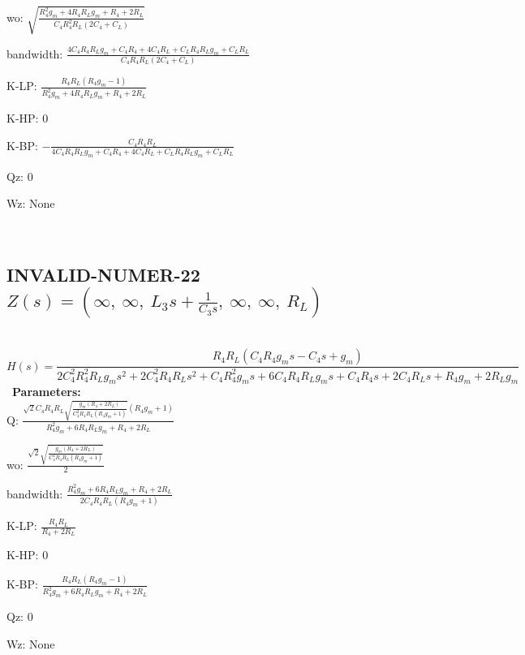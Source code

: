 \documentclass{article}
\begin{document}
wo: $\sqrt{\frac{R_{4}^{2} g_{m} + 4 R_{4} R_{L} g_{m} + R_{4} + 2 R_{L}}{C_{4} R_{4}^{2} R_{L} \left(2 C_{4} + C_{L}\right)}}$\ 

bandwidth: $\frac{4 C_{4} R_{4} R_{L} g_{m} + C_{4} R_{4} + 4 C_{4} R_{L} + C_{L} R_{4} R_{L} g_{m} + C_{L} R_{L}}{C_{4} R_{4} R_{L} \left(2 C_{4} + C_{L}\right)}$\ 

K-LP: $\frac{R_{4} R_{L} \left(R_{4} g_{m} - 1\right)}{R_{4}^{2} g_{m} + 4 R_{4} R_{L} g_{m} + R_{4} + 2 R_{L}}$\ 

K-HP: $0$\ 

K-BP: $- \frac{C_{4} R_{4} R_{L}}{4 C_{4} R_{4} R_{L} g_{m} + C_{4} R_{4} + 4 C_{4} R_{L} + C_{L} R_{4} R_{L} g_{m} + C_{L} R_{L}}$\ 

Qz: $0$\ 

Wz: $\text{None}$\ 

\ 

\subsection{INVALID-NUMER-22 $Z(s) = \left( \infty, \  \infty, \  L_{3} s + \frac{1}{C_{3} s}, \  \infty, \  \infty, \  R_{L}\right)$ } \ 
\textbf{\[H(s) = \frac{R_{4} R_{L} \left(C_{4} R_{4} g_{m} s - C_{4} s + g_{m}\right)}{2 C_{4}^{2} R_{4}^{2} R_{L} g_{m} s^{2} + 2 C_{4}^{2} R_{4} R_{L} s^{2} + C_{4} R_{4}^{2} g_{m} s + 6 C_{4} R_{4} R_{L} g_{m} s + C_{4} R_{4} s + 2 C_{4} R_{L} s + R_{4} g_{m} + 2 R_{L} g_{m}}\] } \ 
\textbf{Parameters:}\\ 

Q: $\frac{\sqrt{2} C_{4} R_{4} R_{L} \sqrt{\frac{g_{m} \left(R_{4} + 2 R_{L}\right)}{C_{4}^{2} R_{4} R_{L} \left(R_{4} g_{m} + 1\right)}} \left(R_{4} g_{m} + 1\right)}{R_{4}^{2} g_{m} + 6 R_{4} R_{L} g_{m} + R_{4} + 2 R_{L}}$\ 

wo: $\frac{\sqrt{2} \sqrt{\frac{g_{m} \left(R_{4} + 2 R_{L}\right)}{C_{4}^{2} R_{4} R_{L} \left(R_{4} g_{m} + 1\right)}}}{2}$\ 

bandwidth: $\frac{R_{4}^{2} g_{m} + 6 R_{4} R_{L} g_{m} + R_{4} + 2 R_{L}}{2 C_{4} R_{4} R_{L} \left(R_{4} g_{m} + 1\right)}$\ 

K-LP: $\frac{R_{4} R_{L}}{R_{4} + 2 R_{L}}$\ 

K-HP: $0$\ 

K-BP: $\frac{R_{4} R_{L} \left(R_{4} g_{m} - 1\right)}{R_{4}^{2} g_{m} + 6 R_{4} R_{L} g_{m} + R_{4} + 2 R_{L}}$\ 

Qz: $0$\ 

Wz: $\text{None}$\ 
\end{document}
